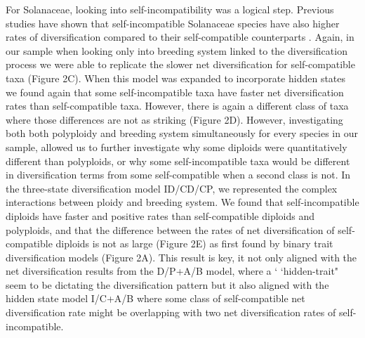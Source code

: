 For Solanaceae, looking into self-incompatibility was a logical step.
Previous studies have shown that self-incompatible Solanaceae species have also higher rates of diversification compared to their self-compatible counterparts \citep{goldberg_2012}. 
Again, in our sample when looking only into breeding system linked to the diversification process we were able to replicate the slower net diversification for self-compatible taxa (Figure 2C). When this model was expanded to incorporate hidden states we found again that some self-incompatible taxa have faster net diversification rates than self-compatible taxa. However, there is again a  different class of taxa where those differences are not as striking (Figure 2D).  However, investigating both  both polyploidy and breeding system simultaneously for every species in our sample, allowed us to further investigate why some diploids were quantitatively different than polyploids, or why some self-incompatible taxa would be different in diversification terms from some self-compatible when a second class is not.
In the three-state diversification model ID/CD/CP, we represented the complex interactions between ploidy and breeding system. We found that self-incompatible diploids have faster and positive rates than self-compatible diploids and polyploids, and that the difference between the  rates of net diversification of self-compatible diploids is not as large (Figure 2E) as first found by binary trait diversification models (Figure 2A).
This result is key, it not only aligned with the net diversification results from the D/P+A/B model, where a `	`hidden-trait" seem to be dictating the diversification pattern but it also aligned with the hidden state model I/C+A/B where some class of self-compatible net diversification rate might be overlapping with two net diversification rates of self-incompatible.




